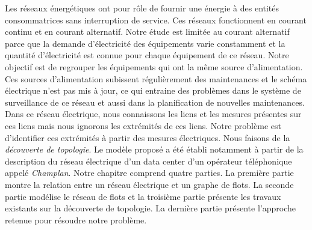 Les r\'eseaux \'energ\'etiques ont pour r\^ole de fournir une \'energie \`a des entit\'es consommatrices sans interruption de service. Ces r\'eseaux fonctionnent en courant continu et en courant alternatif.
\newline
Notre \'etude est limit\'ee au courant alternatif parce que la demande d'\'electricit\'e des \'equipements varie constamment et la quantit\'e d'\'electricit\'e est connue pour chaque \'equipement de ce r\'eseau. 
Notre objectif est de regrouper les \'equipements qui ont la m\^eme source d'alimentation.
Ces sources d'alimentation subissent r\'eguli\`erement des maintenances et le sch\'ema \'electrique n'est pas mis \`a jour, ce qui entraine des probl\`emes dans le syst\`eme de surveillance de ce r\'eseau et aussi dans la planification de nouvelles maintenances.
\newline
Dans ce r\'eseau \'electrique, nous connaissons les liens et les mesures pr\'esentes sur ces liens mais nous ignorons les extr\'emit\'es de ces liens. Notre probl\`eme est d'identifier ces extr\'emit\'es \`a partir des mesures \'electriques. Nous faisons de la {\em d\'ecouverte de topologie}.  
Le mod\`ele propos\'e a \'et\'e \'etabli notamment \`a partir de la description du r\'eseau \'electrique d'un data center d'un op\'erateur t\'el\'ephonique appel\'e {\em Champlan}.
 \newline
Notre chapitre comprend quatre parties. La premi\`ere partie montre la relation entre un r\'eseau \'electrique et un graphe de flots. La seconde partie mod\'elise le r\'eseau de flots et la troisi\`eme partie pr\'esente les travaux existants sur la d\'ecouverte de topologie. 
La derni\`ere partie pr\'esente l'approche retenue pour r\'esoudre notre probl\`eme.